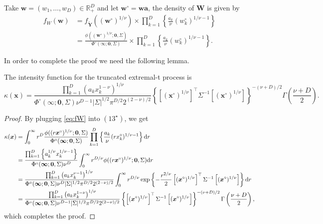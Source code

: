\documentclass[12pt]{article}
\begin{document}
Take $\bm w = (w_1, \ldots, w_D) \in \mathbb{R}^D_+$ and let $\bm w^\circ = \bm w \bm a$, the density of $\bm W$ is given by
%
\begin{align}
\label{eq:fW}
f_W(\bm w) &= f_{\tilde{\bm Y}} \left( \left( \bm w^\circ \right)^{1/\nu} \right) \times \prod_{k=1}^D \left\{ \frac{a_k}{\nu} \left(w_k^\circ \right)^{1/\nu-1} \right\} \nonumber \\
&= \frac{\phi\left( \left( \bm w^\circ \right)^{1/\nu} ;\bm 0, \Sigma \right)} {\Phi^\circ(\bm \infty;\bm 0, \Sigma)} 
\times \prod_{k=1}^D \left\{ \frac{a_k}{\nu} \left(w_k^\circ\right)^{1/\nu-1} \right\}.
\end{align}
%

In order to complete the proof we need the following lemma.

\begin{lemma}
\label{lem:kappEt}
The intensity function for the truncated extremal-t process is
%
\begin{equation*}
\kappa(\bm x) = \frac{\prod_{k=1}^D \left(a_k x_k^{1-\nu}\right)^{1/\nu}}{\Phi^\circ(\bm \infty;\bm 0, \Sigma) \nu^{D-1}|\Sigma|^{1/2}\pi^{D/2}2^{(2-\nu)/2}} \left\{\left[(\bm x^\circ)^{1/\nu}\right]^\top \Sigma^{-1}\left[(\bm x^\circ)^{1/\nu}\right]\right\}^{-(\nu+D)/2} \Gamma\left(\frac{\nu+D}{2}\right).
\end{equation*}
\end{lemma}

\begin{proof}

By plugging \eqref{eq:fW} into $(13^\star)$, we get 
%
\begin{align*}
\kappa(\bm x) &= \int_0^\infty r^D \frac{\phi( (r \bm x^\circ)^{1/\nu};\bm 0, \Sigma)}{\Phi^\circ(\bm \infty;\bm 0, \Sigma)} \prod_{k=1}^D \left\{ \frac{a_k}{\nu} (r x_k^\circ)^{1/\nu-1}\right\}\text d r	\\
&= \frac{\prod_{k=1}^D \left\{a_k^{1/\nu} x_k^{1/\nu-1}\right\}}{\Phi^\circ(\bm \infty;\bm 0, \Sigma)\nu^D}\int_0^\infty r^{D/\nu} \phi( (r\bm x^\circ)^{1/\nu};\bm 0, \Sigma) \text d r\\
&= \frac{\prod_{k=1}^D \left(a_k x_k^{\nu-1}\right)^{1/\nu}}{\Phi^\circ(\bm \infty;\bm 0, \Sigma) \nu^D |\Sigma|^{1/2} \pi^{D/2}2^{(2-\nu)/2}} \int_0^\infty r^{D/\nu} \exp \left\{-\frac{r^{2/\nu}}{2} \left[(\bm x^\circ)^{1/\nu}\right]^\top\Sigma^{-1}\left[(\bm x^\circ)^{1/\nu}\right]\right\} \text dr\\
&= \frac{\prod_{k=1}^D \left(a_k x_k^{1-\nu}\right)^{1/\nu}}{\Phi^\circ(\bm \infty;\bm 0, \Sigma) \nu^{D-1}|\Sigma|^{1/2}\pi^{D/2}2^{(2-\nu)/2}} \left\{\left[(\bm x^\circ)^{1/\nu}\right]^\top \Sigma^{-1}\left[(\bm x^\circ)^{1/\nu}\right]\right\}^{-(\nu+D)/2} \Gamma\left(\frac{\nu+D}{2}\right),
\label{eq:truncated_extremal_t_intensity}
\end{align*}
%
which completes the proof.
%
\end{proof}
\end{document}
